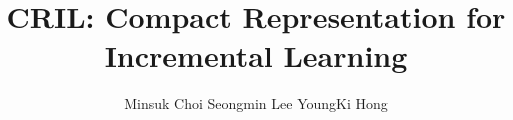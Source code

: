 \documentclass[prodmode,acmtecs]{acmsmall} %
\begin{document}
\title{CRIL: Compact Representation for Incremental Learning}
\author{Minsuk Choi
Seongmin Lee
YoungKi Hong
}



\maketitle










\end{document}
